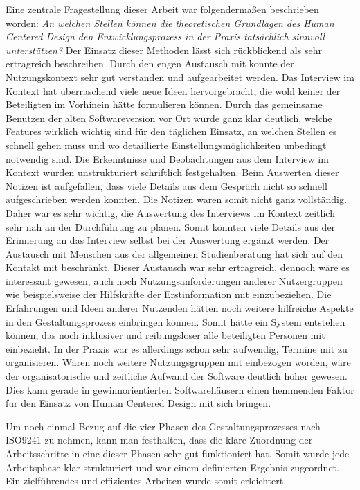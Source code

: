 Eine zentrale Fragestellung dieser Arbeit war folgendermaßen beschrieben
worden: \textit{An welchen Stellen können die theoretischen Grundlagen des
    Human Centered Design den Entwicklungsprozess in der Praxis tatsächlich
    sinnvoll unterstützen?} Der Einsatz dieser Methoden lässt sich rückblickend als
sehr ertragreich beschreiben. Durch den engen Austausch mit \ipName konnte der
Nutzungskontext sehr gut verstanden und aufgearbeitet werden. Das Interview im
Kontext hat überraschend viele neue Ideen hervorgebracht, die wohl keiner der
Beteiligten im Vorhinein hätte formulieren können. Durch das gemeinsame
Benutzen der alten Softwareversion vor Ort wurde ganz klar deutlich, welche
Features wirklich wichtig sind für den täglichen Einsatz, an welchen Stellen es
schnell gehen muss und wo detaillierte Einstellungsmöglichkeiten unbedingt
notwendig sind. Die Erkenntnisse und Beobachtungen aus dem Interview im Kontext
wurden unstrukturiert schriftlich festgehalten. Beim Auswerten dieser Notizen
ist aufgefallen, dass viele Details aus dem Gespräch nicht so schnell
aufgeschrieben werden konnten. Die Notizen waren somit nicht ganz vollständig.
Daher war es sehr wichtig, die Auswertung des Interviews im Kontext zeitlich
sehr nah an der Durchführung zu planen. Somit konnten viele Details aus der
Erinnerung an das Interview selbst bei der Auswertung ergänzt werden. Der
Austausch mit Menschen aus der allgemeinen Studienberatung hat sich auf den Kontakt
mit \ipName beschränkt. Dieser Austausch war sehr ertragreich, dennoch wäre es
interessant gewesen, auch noch Nutzungsanforderungen anderer Nutzergruppen wie
beispielsweise der Hilfskräfte der Erstinformation mit einzubeziehen. Die
Erfahrungen und Ideen anderer Nutzenden hätten noch weitere hilfreiche Aspekte
in den Gestaltungsprozess einbringen können. Somit hätte ein System entstehen
können, das noch inklusiver und reibungsloser alle beteiligten Personen mit
einbezieht. In der Praxis war es allerdings schon sehr aufwendig, Termine mit
\ipName zu organisieren. Wären noch weitere Nutzungsgruppen mit einbezogen
worden, wäre der organisatorische und zeitliche Aufwand der Software deutlich
höher gewesen. Dies kann gerade in gewinnorientierten Softwarehäusern einen
hemmenden Faktor für den Einsatz von Human Centered Design mit sich bringen.

Um noch einmal Bezug auf die vier Phasen des Gestaltungsprozesses nach ISO9241
zu nehmen, kann man festhalten, dass die klare Zuordnung der Arbeitsschritte in
eine dieser Phasen sehr gut funktioniert hat. Somit wurde jede Arbeitsphase
klar strukturiert und war einem definierten Ergebnis zugeordnet. Ein
zielführendes und effizientes Arbeiten wurde somit erleichtert.

